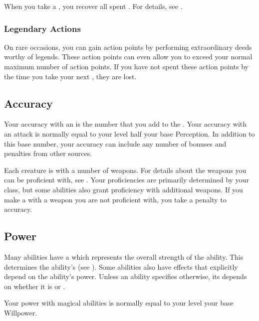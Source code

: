         When you take a , you recover all spent .
        For details, see .

        \subsubsection{Legendary Actions}
            On rare occasions, you can gain action points by performing extraordinary deeds worthy of legends.
            These action points can even allow you to exceed your normal maximum number of action points.
            If you have not spent these action points by the time you take your next , they are lost.

    \subsection{Accuracy}\label{Accuracy}
        Your accuracy with an  is the number that you add to the .
        Your accuracy with an attack is normally equal to your level \add half your base Perception.
        In addition to this base number, your accuracy can include any number of bonuses and penalties from other sources.

         Each creature is  with a number of weapons.
        For details about the weapons you can be proficient with, see .
        Your proficiencies are primarily determined by your class, but some abilities also grant proficiency with additional weapons.
        If you make a  with a weapon you are not proficient with, you take a  penalty to accuracy.

    \subsection{Power}\label{Power}
        Many abilities have a  which represents the overall strength of the ability.
        This determines the ability's  (see ).
        Some abilities also have effects that explicitly depend on the ability's power.
        Unless an ability specifies otherwise, its  depends on whether it is  or .

        Your power with magical abilities is normally equal to your level \add your base Willpower.

